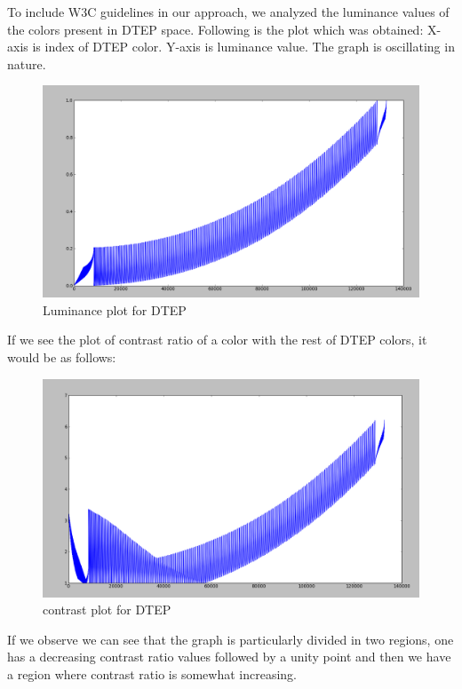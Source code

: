 To include W3C guidelines in our approach, we analyzed the luminance values of the colors present in DTEP space. Following is the plot which was obtained: X-axis is index of DTEP color. Y-axis is luminance value. The graph is oscillating in nature.
\begin{figure}[!htb]
\centering
\includegraphics[width=\linewidth]{luminanceDTEP.png}
\caption{Luminance plot for DTEP}
\label{fig:LuminancePlot}
\end{figure} 

If we see the plot of contrast ratio of a color with the rest of DTEP colors, it would be as follows:
\begin{figure}[!htb]
\centering
\includegraphics[width=\linewidth]{contrastDTEP.png}
\caption{contrast plot for DTEP}
\label{fig:ContrastPlot}
\end{figure}
If we observe we can see that the graph is particularly divided in two regions, one has a decreasing contrast ratio values followed by a unity point and then we have a region where contrast ratio is somewhat increasing. 


